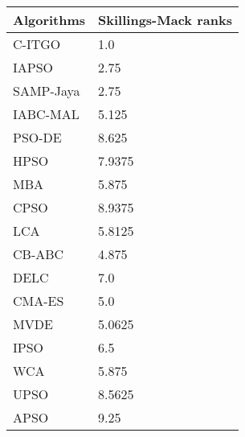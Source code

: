 \begin{table}[h]
    \tiny
    \begin{center}
    
    \begin{tabular}{ | P{3.0cm} | P{3.0cm} | }

    \hline

    \rule{0pt}{3ex}
    \textbf{Algorithms} & \textbf{Skillings-Mack ranks}  \\
    \hline

    \rule{0pt}{3ex}
    C-ITGO & 1.0 \\[1em]

    \rule{0pt}{3ex}
    IAPSO & 2.75 \\[1em]

    \rule{0pt}{3ex}
    SAMP-Jaya & 2.75 \\[1em]

    \rule{0pt}{3ex}
    IABC-MAL & 5.125 \\[1em]

    \rule{0pt}{3ex}
    PSO-DE & 8.625 \\[1em]
    
    \rule{0pt}{3ex}
    HPSO & 7.9375 \\[1em]

    \rule{0pt}{3ex}
    MBA & 5.875 \\[1em]

    \rule{0pt}{3ex}
    CPSO & 8.9375 \\[1em]

    \rule{0pt}{3ex}
    LCA & 5.8125 \\[1em]

    \rule{0pt}{3ex}
    CB-ABC & 4.875 \\[1em]

    \rule{0pt}{3ex}
    DELC & 7.0 \\[1em]

    \rule{0pt}{3ex}
    CMA-ES & 5.0 \\[1em]

    \rule{0pt}{3ex}
    MVDE & 5.0625 \\[1em]

    \rule{0pt}{3ex}
    IPSO & 6.5 \\[1em]

    \rule{0pt}{3ex}
    WCA & 5.875 \\[1em]

    \rule{0pt}{3ex}
    UPSO & 8.5625 \\[1em]


    \rule{0pt}{3ex}
    APSO & 9.25 \\[1em]


\end{tabular}
\end{center}
\end{table}
